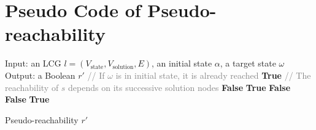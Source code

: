 \documentclass{entcs}
\begin{document}
\section{Pseudo Code of Pseudo-reachability}

\begin{algorithm}[ht]
\begin{algorithmic}
\State Input: an LCG $l=(V_{\mathrm{state}}, {V_\mathrm{solution}},E)$, an initial state $\alpha$, a target state $\omega$
\State Output: a Boolean $r'$
\State \textcolor{gray}{// If $\omega$ is in initial state, it is already reached}
\If {$\omega\in \alpha$}
   \Return \textbf{True}
\EndIf
\State \textcolor{gray}{// The reachability of $s$ depends on its successive solution nodes}
    \Return \textbf{False}
\EndIf
{}
    \Return \textbf{True}
    \EndIf
\EndFor
 \Return \textbf{False}
\EndProcedure
{}
    \Return \textbf{False}
    \EndIf
\EndFor
\Return \textbf{True}
\EndProcedure
\end{algorithmic}
\caption{Pseudo-reachability $r'$}\label{algPseudo}
\end{algorithm}
\end{document}
